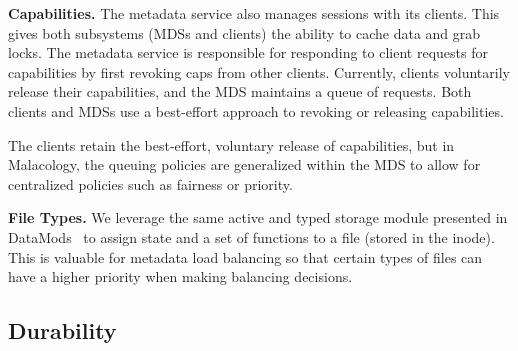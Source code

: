 \documentclass[preprint]{sigplanconf-eurosys}
\begin{document}
{\bf Capabilities.} The metadata service also manages sessions with its
clients. This gives both subsystems (MDSs and clients) the ability to cache
data and grab locks. The metadata service is responsible for responding to
client requests for capabilities by first revoking caps from other clients.
Currently, clients voluntarily release their capabilities, and the MDS maintains
a queue of requests.  Both clients and MDSs use a best-effort approach to
revoking or releasing capabilities.

The clients retain the best-effort, voluntary release of capabilities, but in
Malacology, the queuing policies are generalized within the MDS to allow for
centralized policies such as fairness or priority.

{\bf File Types.} We leverage the same active and typed storage module
presented in DataMods~\cite{watkins_datamods_2012} to assign state and a set of
functions to a file (stored in the inode). This is valuable for
metadata load balancing so that certain types of files can have a higher
priority when making balancing decisions.




\subsection{Durability}
\label{sec:durability}
\end{document}

